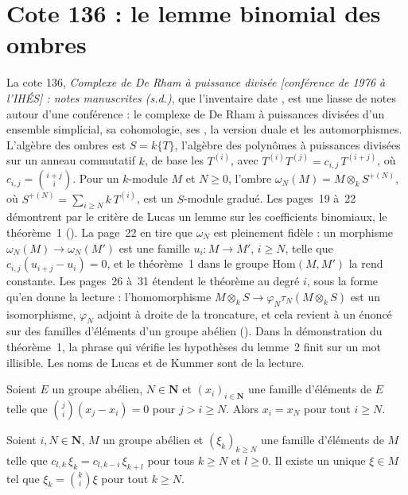 \section[Cote 136 : le lemme binomial des ombres]{Cote 136 : le lemme binomial des ombres\protect{}}\label{sec:136}

La cote 136, \emph{Complexe de De Rham à puissance divisée [conférence de 1976 à l'IHÉS] : notes manuscrites (s.d.)}, que l'inventaire date \q{[à partir de 1975-1976]}, est une liasse de notes autour d'une conférence : le complexe de De Rham à puissances divisées d'un ensemble simplicial, sa cohomologie, ses , la version duale et les automorphismes. L'algèbre des ombres est $S = k\{T\}$, l'algèbre des polynômes à puissances divisées sur un anneau commutatif $k$, de base les $T^{(i)}$, avec $T^{(i)} T^{(j)} = c_{i,j}\, T^{(i+j)}$, où $c_{i,j} = \binom{i+j}{i}$. Pour un $k$-module $M$ et $N \geq 0$, l'ombre $\omega_N(M) = M \otimes_k S^{+(N)}$, où $S^{+(N)} = \sum_{i \geq N} k\, T^{(i)}$, est un $S$-module gradué. Les pages~19 à~22 démontrent par le critère de Lucas un lemme sur les coefficients binomiaux, le théorème~1 (). La page~22 en tire que $\omega_N$ est pleinement fidèle : un morphisme $\omega_N(M) \to \omega_N(M')$ est une famille $u_i : M \to M'$, $i \geq N$, telle que $c_{i,j}(u_{i+j} - u_i) = 0$, et le théorème~1 dans le groupe $\mathrm{Hom}(M, M')$ la rend constante. Les pages~26 à~31 étendent le théorème au degré $i$, sous la forme qu'en donne la lecture : l'homomorphisme $M \otimes_k S \to \varphi_N \tau_N(M \otimes_k S)$ est un isomorphisme, $\varphi_N$ adjoint à droite de la troncature, et cela revient à un énoncé sur des familles d'éléments d'un groupe abélien (). Dans la démonstration du théorème~1, la phrase qui vérifie les hypothèses du lemme~2 finit sur un mot illisible. Les noms de Lucas et de Kummer sont de la lecture.

\begin{encadre}
\begin{theoreme}\label{thm:136-1}
Soient $E$ un groupe abélien, $N \in \mathbf N$ et $(x_i)_{i \in \mathbf N}$ une famille d'éléments de $E$ telle que $\binom{j}{i}(x_j - x_i) = 0$ pour $j > i \geq N$. Alors $x_i = x_N$ pour tout $i \geq N$.
\end{theoreme}
\end{encadre}

\begin{encadre}
\begin{theoreme}\label{thm:136-i}
Soient $i, N \in \mathbf N$, $M$ un groupe abélien et $(\xi_k)_{k \geq N}$ une famille d'éléments de $M$ telle que $c_{l,k}\, \xi_k = c_{l,k-i}\, \xi_{k+l}$ pour tous $k \geq N$ et $l \geq 0$. Il existe un unique $\xi \in M$ tel que $\xi_k = \binom{k}{i} \xi$ pour tout $k \geq N$.
\end{theoreme}
\end{encadre}

